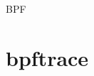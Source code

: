 \documentclass[12pt, a4paper]{article}
\begin{document}
	
	\begin{center} {\Huge BPF} \end{center}

	\tableofcontents
	
	

	\section{bpftrace}
	
	
	
	

\end{document}
